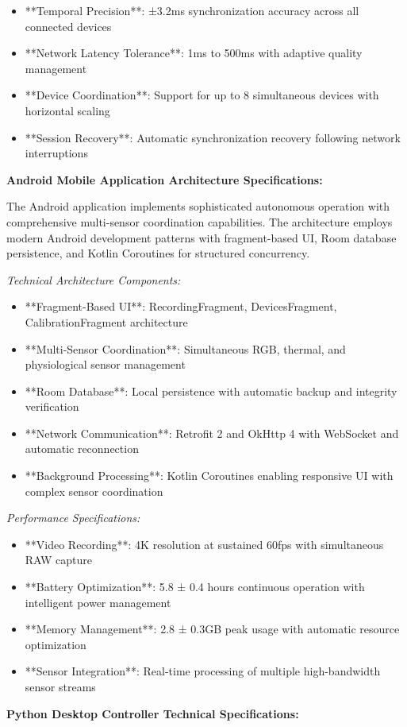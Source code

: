 \documentclass[11pt,a4paper]{article}
\begin{document}
\begin{itemize}
\item **Temporal Precision**: ±3.2ms synchronization accuracy across all connected devices
\item **Network Latency Tolerance**: 1ms to 500ms with adaptive quality management
\item **Device Coordination**: Support for up to 8 simultaneous devices with horizontal scaling
\item **Session Recovery**: Automatic synchronization recovery following network interruptions

\end{itemize}
\textbf{Android Mobile Application Architecture Specifications:}

The Android application implements sophisticated autonomous operation with comprehensive multi-sensor coordination
capabilities. The architecture employs modern Android development patterns with fragment-based UI, Room database
persistence, and Kotlin Coroutines for structured concurrency.

\textit{Technical Architecture Components:}

\begin{itemize}
\item **Fragment-Based UI**: RecordingFragment, DevicesFragment, CalibrationFragment architecture
\item **Multi-Sensor Coordination**: Simultaneous RGB, thermal, and physiological sensor management
\item **Room Database**: Local persistence with automatic backup and integrity verification
\item **Network Communication**: Retrofit 2 and OkHttp 4 with WebSocket and automatic reconnection
\item **Background Processing**: Kotlin Coroutines enabling responsive UI with complex sensor coordination

\end{itemize}
\textit{Performance Specifications:}

\begin{itemize}
\item **Video Recording**: 4K resolution at sustained 60fps with simultaneous RAW capture
\item **Battery Optimization**: 5.8 ± 0.4 hours continuous operation with intelligent power management
\item **Memory Management**: 2.8 ± 0.3GB peak usage with automatic resource optimization
\item **Sensor Integration**: Real-time processing of multiple high-bandwidth sensor streams

\end{itemize}
\textbf{Python Desktop Controller Technical Specifications:}
\end{document}
